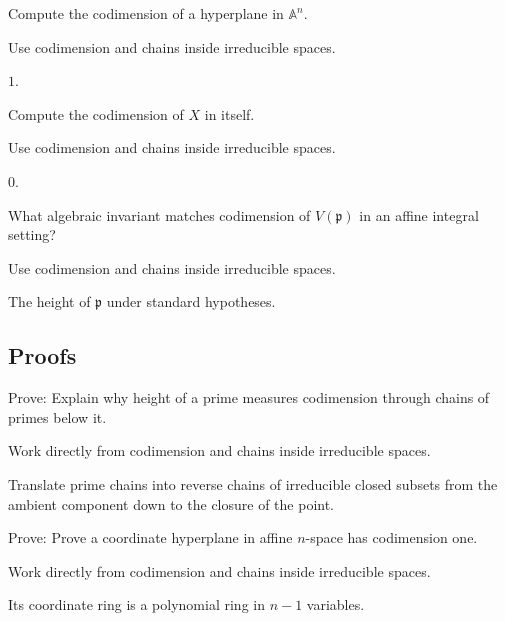 \begin{exercise}[Hyperplane]\label{exr:vi31-expand-03}
Compute the codimension of a hyperplane in $\mathbb A^n$.
\end{exercise}
\begin{hint}
Use codimension and chains inside irreducible spaces.
\end{hint}
\begin{solution}
$1$.
\end{solution}

\begin{exercise}\label{exr:vi31-expand-04}
Compute the codimension of $X$ in itself.
\end{exercise}
\begin{hint}
Use codimension and chains inside irreducible spaces.
\end{hint}
\begin{solution}
$0$.
\end{solution}

\begin{exercise}\label{exr:vi31-expand-05}
What algebraic invariant matches codimension of $V(\mathfrak p)$ in an affine integral setting?
\end{exercise}
\begin{hint}
Use codimension and chains inside irreducible spaces.
\end{hint}
\begin{solution}
The height of $\mathfrak p$ under standard hypotheses.
\end{solution}

\subsection*{Proofs}

\begin{exercise}\label{exr:vi31-expand-06}
Prove: Explain why height of a prime measures codimension through chains of primes below it.
\end{exercise}
\begin{hint}
Work directly from codimension and chains inside irreducible spaces.
\end{hint}
\begin{solution}
Translate prime chains into reverse chains of irreducible closed subsets from the ambient component down to the closure of the point.
\end{solution}

\begin{exercise}\label{exr:vi31-expand-07}
Prove: Prove a coordinate hyperplane in affine $n$-space has codimension one.
\end{exercise}
\begin{hint}
Work directly from codimension and chains inside irreducible spaces.
\end{hint}
\begin{solution}
Its coordinate ring is a polynomial ring in $n-1$ variables.
\end{solution}

